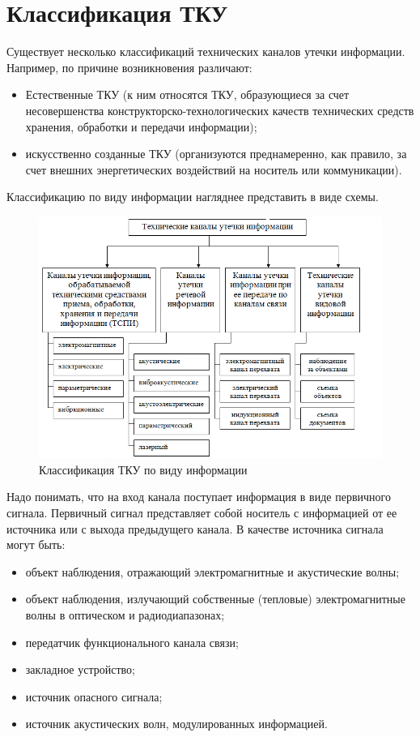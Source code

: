 \section{Классификация ТКУ}

Существует несколько классификаций технических каналов утечки информации. Например, по причине возникновения различают:

\begin{itemize}
	\item Естественные ТКУ (к ним относятся ТКУ, образующиеся за счет несовершенства конструкторско-технологических качеств технических средств хранения, обработки и передачи информации);
	\item искусственно созданные ТКУ (организуются преднамеренно, как правило, за счет внешних энергетических воздействий на носитель или коммуникации).
\end{itemize}

Классификацию по виду информации нагляднее представить в виде схемы.

\begin{figure}[H]
	\centering
	\includegraphics[width=0.7\linewidth]{"img/Tcoibl6_2"}
	\caption{Классификация ТКУ по виду информации}
\end{figure}

Надо понимать, что на вход канала поступает информация в виде первичного сигнала. Первичный сигнал представляет собой носитель с информацией от ее источника или с выхода предыдущего канала. В качестве источника сигнала могут быть:

\begin{itemize}
\item объект наблюдения, отражающий электромагнитные и акустические волны;
\item объект наблюдения, излучающий собственные (тепловые) электромагнитные волны в оптическом и радиодиапазонах;
\item передатчик функционального канала связи;
\item закладное устройство;
\item источник опасного сигнала;
\item источник акустических волн, модулированных информацией.
\end{itemize}

